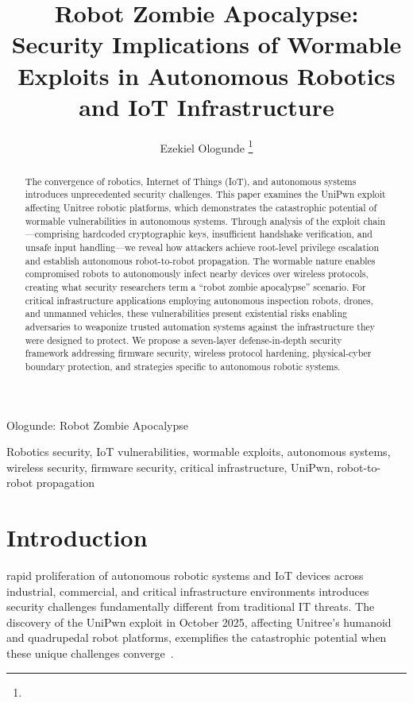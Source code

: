 \documentclass[journal]{IEEEtran}
\begin{document}
\title{Robot Zombie Apocalypse: Security Implications of Wormable Exploits in Autonomous Robotics and IoT Infrastructure}

\author{Ezekiel Ologunde%
\thanks{}}

%
{Ologunde: Robot Zombie Apocalypse}

\maketitle

\begin{abstract}
The convergence of robotics, Internet of Things (IoT), and autonomous systems introduces
unprecedented security challenges. This paper examines the UniPwn exploit affecting
Unitree robotic platforms, which demonstrates the catastrophic potential of wormable
vulnerabilities in autonomous systems. Through analysis of the exploit chain---comprising
hardcoded cryptographic keys, insufficient handshake verification, and unsafe input
handling---we reveal how attackers achieve root-level privilege escalation and establish
autonomous robot-to-robot propagation. The wormable nature enables compromised robots to
autonomously infect nearby devices over wireless protocols, creating what security
researchers term a ``robot zombie apocalypse'' scenario. For critical infrastructure
applications employing autonomous inspection robots, drones, and unmanned vehicles, these
vulnerabilities present existential risks enabling adversaries to weaponize trusted
automation systems against the infrastructure they were designed to protect. We propose a
seven-layer defense-in-depth security framework addressing firmware security, wireless
protocol hardening, physical-cyber boundary protection, and strategies specific to
autonomous robotic systems.
\end{abstract}

\begin{IEEEkeywords}
Robotics security, IoT vulnerabilities, wormable exploits, autonomous systems, wireless
security, firmware security, critical infrastructure, UniPwn, robot-to-robot propagation
\end{IEEEkeywords}

\section{Introduction}
 rapid proliferation of autonomous robotic systems and IoT devices
across industrial, commercial, and critical infrastructure environments introduces
security challenges fundamentally different from traditional IT threats. The discovery of
the UniPwn exploit in October 2025, affecting Unitree's humanoid and quadrupedal robot
platforms, exemplifies the catastrophic potential when these unique challenges
converge~\cite{udinmwen2025calm}.
\end{document}
